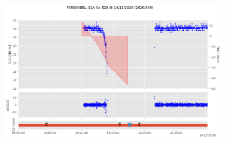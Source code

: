 \begin{enumerate}
\begin{figure}[H]%
\centering%
\includegraphics[width=0.95\linewidth]{png/P3RS04BEL_R_20203490000_01D_00U_MO_E-S1A-E25.png}%
\end{figure}


\end{enumerate}
